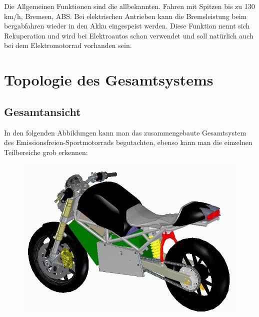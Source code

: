 Die Allgemeinen Funktionen sind die allbekannten. Fahren mit Spitzen bis zu 130 km/h, Bremsen, ABS. Bei elektrischen Antrieben kann die Bremsleistung beim bergabfahren wieder in den Akku eingespeist werden. Diese Funktion nennt sich Rekuperation und wird bei Elektroautos schon verwendet und soll natürlich auch bei dem Elektromotorrad vorhanden sein.
\newpage

\section{Topologie des Gesamtsystems}

\subsection{Gesamtansicht}

In den folgenden Abbildungen kann man das zusammengebaute Gesamtsystem des Emissionsfreien-Sportmotorrads begutachten, ebenso kann man die einzelnen Teilbereiche grob erkennen:

\begin{figure} [H]
	\begin{center}
		\includegraphics[scale=0.7] {figures/mechanik/Ducati1.jpg}
	\end{center}
\end{figure}

